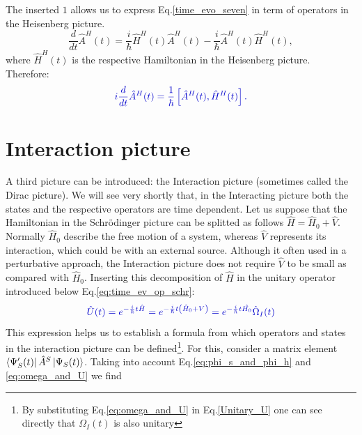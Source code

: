 \documentclass[
11pt, %
english, %
singlespacing, %
headsepline, %
]{MastersDoctoralThesis} %
\begin{document}
The inserted $ 1 $ allows us to express Eq.\enskip\eqref{time_evo_seven} in term of operators in the Heisenberg picture.
\begin{equation}
\frac{d}{dt}\hat{A}^{H}(t)
	=\frac{i}{\hbar}
	\hat{H}^{H}(t)\hat{A}^{H}(t)
	-
	\frac{i}{\hbar}
	\hat{A}^{H}(t)\hat{H}^{H}(t),
\end{equation} 
where $ \hat{H}^{H}(t) $ is the respective Hamiltonian in the Heisenberg  picture.
Therefore:
\begin{equation}\label{eq:Heisenberg_time_dep._eq.}
\textcolor[RGB]{0,0,204}{
i\frac{d}{d t}\hat{A}^{H}(t)=
\frac{1}{\hbar}\left[ \hat{A}^{H}(t),\hat{H}^{H}(t)\right] 
.
}
\end{equation} 
\section{Interaction picture}\label{Interactionpicture}
A third picture can be introduced: the Interaction picture (sometimes called the Dirac picture). We will see very shortly that, in the Interacting picture both the states and the respective operators are time dependent.
Let us suppose that the Hamiltonian in the Schrödinger picture can be splitted as follows $ \hat{H} = \hat{H}_{0}+\hat{V} $. Normally $ \hat{H}_{0} $ describe the free motion of a system, whereas  $ \hat{V} $ represents its interaction, which could be with an external source. Although it often used in a perturbative approach, the Interaction picture does not require $ \hat{V} $  to be small as compared with $ \hat{H}_{0} $. 
Inserting this decomposition of $ \hat{H} $ in the unitary operator introduced below Eq.\enskip\eqref{eq:time_ev_op_schr}:
\begin{equation}\label{eq:omega_and_U}
\textcolor[RGB]{0,0,204}{
\hat{U}(t)=e^{-\frac{i}{\hbar}t \hat{H}}
=e^{-\frac{i}{\hbar}t\left(  \hat{H}_{0}+V\right) }
=
e^{-\frac{i}{\hbar}t \hat{H_{0}}}
\hat{\Omega}_{I} (t)
}
\end{equation}
This expression helps us to establish a formula from which operators and states in the interaction picture can be defined\footnote{By substituting Eq.\enskip\eqref{eq:omega_and_U} in Eq.\enskip\eqref{Unitary_U} one can see directly that $ \Omega_{I}(t) $ is also unitary}. For this, consider a matrix element $ 	\bra{\Psi_{S}^{\prime}(t)}
	\hat{A}^{S}
	\ket{\Psi_{S}(t)} $. Taking into account Eq.\enskip\eqref{eq:phi_s_and_phi_h} and \eqref{eq:omega_and_U} we find
\end{document}
